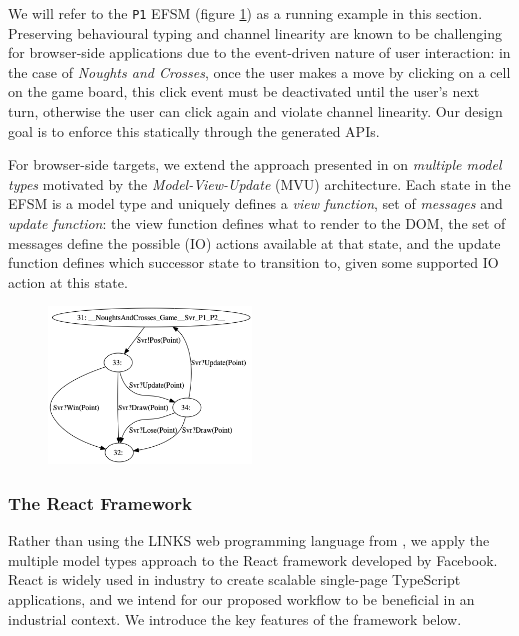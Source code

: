 \documentclass[submission,copyright,creativecommons]{eptcs}
\begin{document}
We will refer to the \texttt{P1} EFSM (figure \ref{fig:efsmp1}) as a
running example in this section. Preserving behavioural typing and
channel linearity are known to be challenging for browser-side
applications due to the event-driven nature of user interaction: in
the case of \textit{Noughts and Crosses}, once the user makes a move
by clicking on a cell on the game board, this click event must be
deactivated until the user's next turn, otherwise the user can click
again and violate channel linearity. Our design goal is to enforce
this statically through the generated APIs. 

For browser-side targets, we extend the approach presented in \cite{MVU2019} on \textit{multiple model types} motivated by the \textit{Model-View-Update} (MVU) architecture. Each state in the EFSM is a model type and uniquely defines a \textit{view function}, set of \textit{messages} and \textit{update function}: the view function defines what to render to the DOM, the set of messages define the possible (IO) actions available at that state, and the update function defines which successor state to transition to, given some supported IO action at this state.


\begin{figure}
  \begin{center}
    \includegraphics[width=0.48\textwidth]{figures/efsm_p1.png}
  \end{center}

  \label{fig:efsmp1}
\end{figure}

\subsubsection{The React Framework}
Rather than using the LINKS web programming language from \cite{MVU2019}, we apply the multiple model types approach to the React framework \cite{React} developed by Facebook. React is widely used in industry to create scalable single-page TypeScript applications, and we intend for our proposed workflow to be beneficial in an industrial context. We introduce the key features of the framework below.
\end{document}
